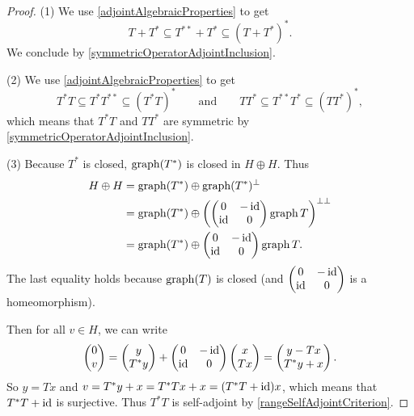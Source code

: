 \begin{proof}
(1) We use \ref{adjointAlgebraicProperties} to get
\[ T+T^* \subseteq T^{**} + T^* \subseteq (T+T^*)^*. \]
We conclude by \ref{symmetricOperatorAdjointInclusion}.

(2) We use \ref{adjointAlgebraicProperties} to get
\[ T^*T \subseteq T^*T^{**} \subseteq (T^*T)^* \qquad\text{and}\qquad TT^* \subseteq T^{**}T^* \subseteq (TT^*)^*, \]
which means that $T^*T$ and $TT^*$ are symmetric by \ref{symmetricOperatorAdjointInclusion}.

(3) Because $T^*$ is closed, $\operatorname{graph}(T^*)$ is closed in $H\oplus H$. Thus
\begin{align*}
H\oplus H &= \operatorname{graph}(T^*) \oplus \operatorname{graph}(T^*)^\perp \\
&= \operatorname{graph}(T^*) \oplus \left(\begin{pmatrix}
0 & -\operatorname{id} \\ \operatorname{id} & 0
\end{pmatrix}\operatorname{graph}{T}\right)^{\perp\perp} \\
&= \operatorname{graph}(T^*) \oplus \begin{pmatrix}
0 & -\operatorname{id} \\ \operatorname{id} & 0
\end{pmatrix}\operatorname{graph}{T}.
\end{align*}
The last equality holds because $\operatorname{graph}(T)$ is closed (and $\begin{pmatrix}
0 & -\operatorname{id} \\ \operatorname{id} & 0
\end{pmatrix}$ is a homeomorphism).

Then for all $v\in H$, we can write
\[ \begin{pmatrix}
0 \\ v
\end{pmatrix} = \begin{pmatrix}
y \\ T^*y
\end{pmatrix} + \begin{pmatrix}
0 & -\operatorname{id} \\ \operatorname{id} & 0
\end{pmatrix}\begin{pmatrix}
x \\ Tx
\end{pmatrix} = \begin{pmatrix}
y - Tx \\ T^*y + x
\end{pmatrix}. \]
So $y = Tx$ and $v = T^*y + x = T^*Tx + x = (T^*T +\operatorname{id})x$, which means that $T^*T +\operatorname{id}$ is surjective. Thus $T^*T$ is self-adjoint by \ref{rangeSelfAdjointCriterion}.


\end{proof}
